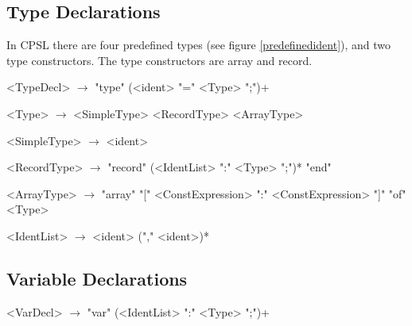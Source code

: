 \documentclass{book}
\begin{document}
\subsection{Type Declarations}

In CPSL there are four predefined types (see figure \ref{predefinedident}), and two type constructors.
The type constructors are array and record.

\begin{grammar}
<TypeDecl> $\rightarrow$ "type" (<ident> "=" <Type> ";")+

<Type> $\rightarrow$ <SimpleType> \alt <RecordType> \alt <ArrayType>

<SimpleType> $\rightarrow$ <ident>

<RecordType> $\rightarrow$ "record" (<IdentList> ":" <Type> ";")* "end"

<ArrayType> $\rightarrow$ "array" "[" <ConstExpression> ":" <ConstExpression> "]" "of" <Type>

<IdentList> $\rightarrow$ <ident> ("," <ident>)*
\end{grammar}

\subsection{Variable Declarations}
\begin{grammar}
<VarDecl> $\rightarrow$ "var" (<IdentList> ":" <Type> ";")+
\end{grammar}
\end{document}
